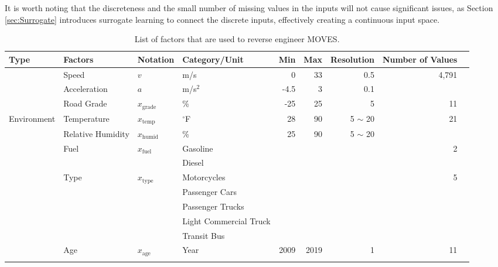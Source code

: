 \documentclass[12pt,english]{article}
\begin{document}
It is worth noting that the discreteness and the small number of missing values in the inputs will not cause significant issues, as Section \ref{sec:Surrogate} introduces surrogate learning to connect the discrete inputs, effectively creating a continuous input space.



\begin{table}[ht]
\centering
\footnotesize
\setlength\tabcolsep{5.5pt} %
\caption{List of factors that are used to reverse engineer MOVES.\vspace{-2mm}}
\begin{tabular}{llllrrrrr} 
\hline
Type & Factors     & Notation       & Category/Unit        & Min    & Max    & Resolution & Number of Values \\ 
\hline
\addlinespace[1mm] %
\multirow{2}{*}{Dynamics}  & Speed & $v$ & m/s & 0 & 33 & 0.5 & \multirow{2}{*}{4,791} \\
& Acceleration & $a$ & m/s\(^2\) & -4.5 & 3 & 0.1 &  \\
\addlinespace[2mm] %
 & Road Grade   & $x_\text{grade}$  & \%  & -25 & 25  & 5   & 11     \\ 
Environment & Temperature & $x_\text{temp}$ & $^\circ$F & 28 & 90 & 5 $\sim$ 20 & \multirow{2}{*}{21} \\
& Relative Humidity & $x_\text{humid}$ & \% & 25 & 90 & 5 $\sim$ 20 & \\
\addlinespace[2mm] %
\multirow{8}{*}{Vehicle} & \multirow{2}{*}{Fuel} & \multirow{2}{*}{$x_\text{fuel}$} & Gasoline &  &  &  & \multirow{2}{*}{2} \\
& & & Diesel &  &  &  &  \\
\addlinespace[2mm] %
& \multirow{5}{*}{Type} & \multirow{5}{*}{$x_\text{type}$}  & Motorcycles & & & & \multirow{5}{*}{5} \\
& & & Passenger Cars & & & & \\
& & & Passenger Trucks & & & & \\
& & & Light Commercial Truck & & & & \\
& & & Transit Bus & & & & \\
\addlinespace[2mm] %
& Age   & $x_\text{age}$  & Year  & 2009 & 2019 & 1  & 11    \\ 
\addlinespace[1mm] %
\hline
\end{tabular}
\label{table:dimensions}
\end{table}
\end{document}
